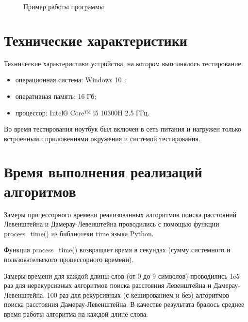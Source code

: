 \begin{figure}[h!]
	
	
	\caption{Пример работы программы}
	
	\label{fig:prog_exmpl2}
	
\end{figure}

\section{Технические характеристики}

Технические характеристики устройства, на котором выполнялось тестирование:

\begin{itemize}
	\item операционная система: Windows 10~\cite{windows10};
	\item оперативная память: 16 Гб;
	\item процессор: Intel® Core™ i5 10300H 2.5 ГГц.
\end{itemize}

Во время тестирования ноутбук был включен в сеть питания и нагружен только встроенными приложениями окружения и системой тестирования.

\section{Время выполнения реализаций алгоритмов}

Замеры процессорного времени реализованных алгоритмов поиска расстояний Левенштейна и Дамерау-Левенштейна проводились с помощью функции process\_time() из библиотеки time языка Python. 

Функция process\_time() возвращает время в секундах (сумму системного и пользовательского процессорного времени).

Замеры времени для каждой длины слов (от 0 до 9 символов) проводились 1e5 раз для нерекурсивных алгоритмов поиска расстояния Левенштейна и Дамерау-Левенштейна, 100 раз для рекурсивных (с кешированием и без) алгоритмов поиска расстояния Дамерау-Левенштейна. В качестве результата бралось среднее время работы алгоритма на каждой длине слова.

